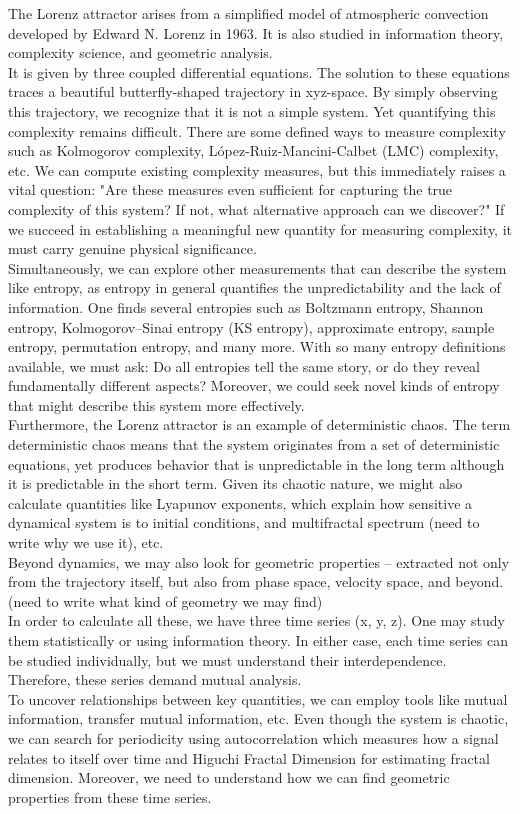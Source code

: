 \documentclass[%
 reprint,
 amsmath,amssymb,
 aps,
 floatfix,
]{revtex4-2}
\begin{document}
The Lorenz attractor arises from a simplified model of atmospheric convection developed by Edward N. Lorenz in 1963. It is also studied in information theory, complexity science, and geometric analysis.\\
It is given by three coupled differential equations. The solution to these equations traces a beautiful butterfly-shaped trajectory in xyz-space. By simply observing this trajectory, we recognize that it is not a simple system. Yet quantifying this complexity remains difficult. There are some defined ways to measure complexity such as Kolmogorov complexity, López-Ruiz-Mancini-Calbet (LMC) complexity, etc. 
We can compute existing complexity measures, but this immediately raises a vital question: "Are these measures even sufficient for capturing the true complexity of this system? If not, what alternative approach can we discover?"
If we succeed in establishing a meaningful new quantity for measuring complexity, it must carry genuine physical significance.\\
Simultaneously, we can explore other measurements that can describe the system like entropy, as entropy in general quantifies the unpredictability and the lack of information. One finds several entropies such as Boltzmann entropy, Shannon entropy, Kolmogorov–Sinai entropy (KS entropy), approximate entropy, sample entropy, permutation entropy, and many more. With so many entropy definitions available, we must ask: Do all entropies tell the same story, or do they reveal fundamentally different aspects? Moreover, we could seek novel kinds of entropy that might describe this system more effectively.\\
Furthermore, the Lorenz attractor is an example of deterministic chaos. The term deterministic chaos means that the system originates from a set of deterministic equations, yet produces behavior that is unpredictable in the long term although it is predictable in the short term. Given its chaotic nature, we might also calculate quantities like Lyapunov exponents, which explain how sensitive a dynamical system is to initial conditions, and multifractal spectrum (need to write why we use it), etc.\\
Beyond dynamics, we may also look for geometric properties – extracted not only from the trajectory itself, but also from phase space, velocity space, and beyond. (need to write what kind of geometry we may find)\\
In order to calculate all these, we have three time series (x, y, z). One may study them statistically or using information theory. In either case, each time series can be studied individually, but we must understand their interdependence. Therefore, these series demand mutual analysis.\\
To uncover relationships between key quantities, we can employ tools like mutual information, transfer mutual information, etc. Even though the system is chaotic, we can search for periodicity using autocorrelation which measures how a signal relates to itself over time and Higuchi Fractal Dimension for estimating fractal dimension.  Moreover, we need to understand how we can find geometric properties from these time series.
\end{document}
